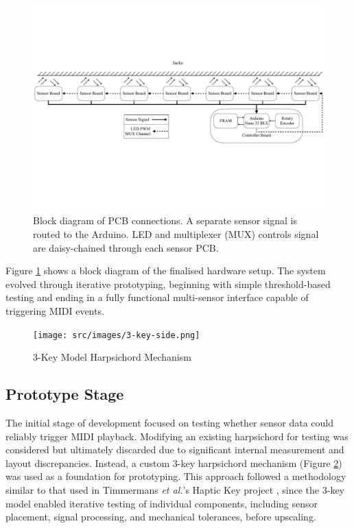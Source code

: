 \begin{figure}
    \centering
    \includegraphics[width=\linewidth]{src/images/block-diagram-2.pdf}
    \caption{Block diagram of PCB connections. A separate sensor signal is routed to the Arduino. LED and multiplexer (MUX) controls signal are daisy-chained through each sensor PCB.}
    \label{fig:system-block-diagram}
\end{figure}

Figure \ref{fig:system-block-diagram} shows a block diagram of the finalised hardware setup. 
The system evolved through iterative prototyping, beginning with simple threshold-based testing and ending in a fully functional multi-sensor interface capable of triggering MIDI events. 

\begin{figure}
    \centering    
    \texttt{[image: src/images/3-key-side.png]}
    \caption{
    3-Key Model Harpsichord Mechanism    
    }
    \label{fig:3key}
\end{figure}

\subsection{Prototype Stage}

The initial stage of development focused on testing whether sensor data could reliably trigger MIDI playback. Modifying an existing harpsichord for testing was considered but ultimately discarded due to significant internal measurement and layout discrepancies. Instead, a custom 3-key harpsichord mechanism (Figure \ref{fig:3key}) was used as a foundation for prototyping. This approach followed a methodology similar to that used in Timmermans \emph{et al.}'s Haptic Key project \cite{Timmermans2020}, since the 3-key model enabled iterative testing of individual components, including sensor placement, signal processing, and mechanical tolerances, before upscaling. 

